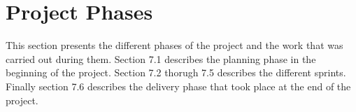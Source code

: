 \chapter{Project Phases}
	
	This section presents the different phases of the project and the work that was carried out 
	during them. Section 7.1 describes the planning phase in the beginning of the project. 
	Section 7.2 thorugh 7.5 describes the different sprints. Finally section 7.6 describes 
	the delivery phase that took place at the end of the project.